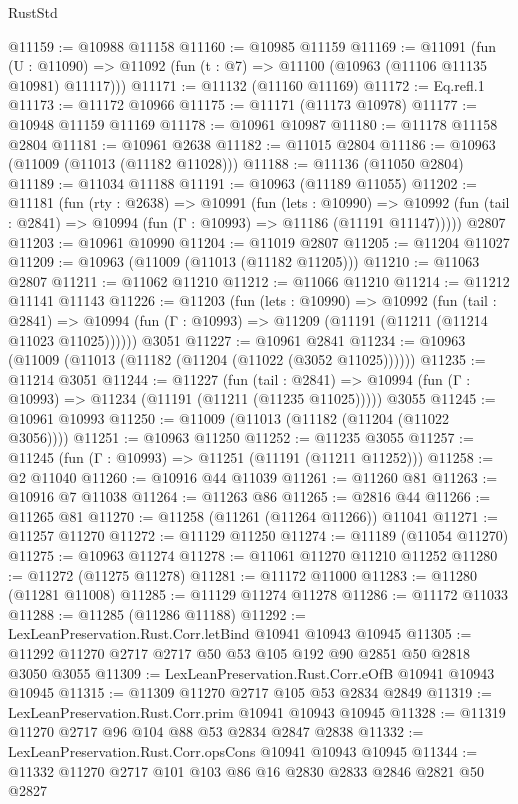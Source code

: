 \begin{lexlean}{RustStd}
\begin{coremodule}
{\begin{coremodule}
{{{{{{{{{{{{{{{{{{{{{{{{{{{{{{{{{@11159 := @10988 @11158
@11160 := @10985 @11159
@11169 := @11091
    (fun (U : @11090) => @11092 (fun (t : @7) => @11100 (@10963 (@11106 @11135 @10981) @11117)))
@11171 := @11132 (@11160 @11169)
@11172 := Eq.refl.{1}
@11173 := @11172 @10966
@11175 := @11171 (@11173 @10978)
@11177 := @10948 @11159 @11169
@11178 := @10961 @10987
@11180 := @11178 @11158 @2804
@11181 := @10961 @2638
@11182 := @11015 @2804
@11186 := @10963 (@11009 (@11013 (@11182 @11028)))
@11188 := @11136 (@11050 @2804)
@11189 := @11034 @11188
@11191 := @10963 (@11189 @11055)
@11202 := @11181
    (fun (rty : @2638) =>
    @10991
      (fun (lets : @10990) =>
      @10992 (fun (tail : @2841) => @10994 (fun (Γ : @10993) => @11186 (@11191 @11147)))))
    @2807
@11203 := @10961 @10990
@11204 := @11019 @2807
@11205 := @11204 @11027
@11209 := @10963 (@11009 (@11013 (@11182 @11205)))
@11210 := @11063 @2807
@11211 := @11062 @11210
@11212 := @11066 @11210
@11214 := @11212 @11141 @11143
@11226 := @11203
    (fun (lets : @10990) =>
    @10992
      (fun (tail : @2841) =>
      @10994 (fun (Γ : @10993) => @11209 (@11191 (@11211 (@11214 @11023 @11025))))))
    @3051
@11227 := @10961 @2841
@11234 := @10963 (@11009 (@11013 (@11182 (@11204 (@11022 (@3052 @11025))))))
@11235 := @11214 @3051
@11244 := @11227
    (fun (tail : @2841) => @10994 (fun (Γ : @10993) => @11234 (@11191 (@11211 (@11235 @11025)))))
    @3055
@11245 := @10961 @10993
@11250 := @11009 (@11013 (@11182 (@11204 (@11022 @3056))))
@11251 := @10963 @11250
@11252 := @11235 @3055
@11257 := @11245 (fun (Γ : @10993) => @11251 (@11191 (@11211 @11252)))
@11258 := @2 @11040
@11260 := @10916 @44 @11039
@11261 := @11260 @81
@11263 := @10916 @7 @11038
@11264 := @11263 @86
@11265 := @2816 @44
@11266 := @11265 @81
@11270 := @11258 (@11261 (@11264 @11266)) @11041
@11271 := @11257 @11270
@11272 := @11129 @11250
@11274 := @11189 (@11054 @11270)
@11275 := @10963 @11274
@11278 := @11061 @11270 @11210 @11252
@11280 := @11272 (@11275 @11278)
@11281 := @11172 @11000
@11283 := @11280 (@11281 @11008)
@11285 := @11129 @11274 @11278
@11286 := @11172 @11033
@11288 := @11285 (@11286 @11188)
@11292 := LexLeanPreservation.Rust.Corr.letBind @10941 @10943 @10945
@11305 := @11292 @11270 @2717 @2717 @50 @53 @105 @192 @90 @2851 @50 @2818 @3050 @3055
@11309 := LexLeanPreservation.Rust.Corr.eOfB @10941 @10943 @10945
@11315 := @11309 @11270 @2717 @105 @53 @2834 @2849
@11319 := LexLeanPreservation.Rust.Corr.prim @10941 @10943 @10945
@11328 := @11319 @11270 @2717 @96 @104 @88 @53 @2834 @2847 @2838
@11332 := LexLeanPreservation.Rust.Corr.opsCons @10941 @10943 @10945
@11344 := @11332 @11270 @2717 @101 @103 @86 @16 @2830 @2833 @2846 @2821 @50 @2827
}}}}}}}}}}}}}}}}}}}}}}}}}}}}}}}}}
\end{coremodule}}
\end{coremodule}
\end{lexlean}
